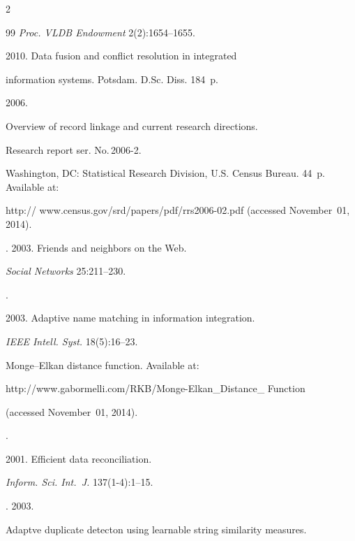 \begin{multicols}{2}
{{\begin{thebibliography}{99}
\textit{Proc. VLDB Endowment} 2(2):1654--1655.




 2010. Data fusion and conflict resolution in integrated

information systems.  Potsdam. D.Sc. Diss. 184~p.






 2006.

Overview of record linkage and current research directions.

 Research report ser. No.\,2006-2.

Washington, DC: Statistical Research Division, U.S. Census Bureau. 44~p. Available at:

{\sf http:// www.census.gov/srd/papers/pdf/rrs2006-02.pdf} (accessed November~01, 2014).


. 2003. Friends and neighbors on the Web.

\textit{Social Networks} 25:211--230.


.

2003. Adaptive name matching in information integration.

\textit{IEEE Intell. Syst.} 18(5):16--23.


Monge--Elkan distance function. Available at:

{\sf http://\linebreak www.gabormelli.com/RKB/Monge-Elkan\_Distance\_ Function}

(accessed November~01, 2014).


.

2001. Efficient data reconciliation.

\textit{Inform. Sci. Int.~J.} 137(1-4):1--15.


. 2003.

Adaptve duplicate detecton using learnable string similarity measures.


\end{thebibliography}}}
\end{multicols}
